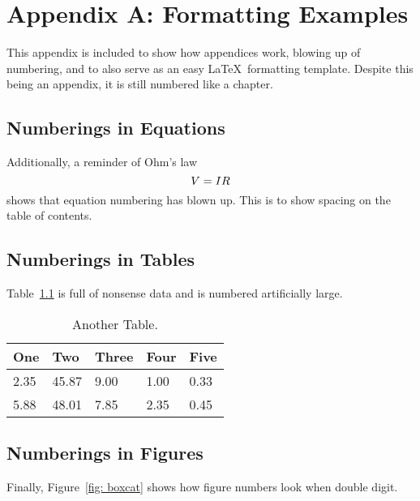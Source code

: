 \chapter{Appendix A: Formatting Examples}


\setcounter{figure}{66}
\setcounter{table}{13}
\setcounter{equation}{41}
This appendix is included to show how appendices work, blowing up of numbering, and to also serve as an easy \LaTeX\ formatting template. Despite this being an appendix, it is still numbered like a chapter.

\section{Numberings in Equations}
Additionally, a reminder of Ohm's law
\begin{equation}{\label{eq:ohms law} }
V = IR
\end{equation} %
\noindent shows that equation numbering has blown up. This is to show spacing on the table of contents.
 
\section{Numberings in Tables}
Table~\ref{tab:exp2} is full of nonsense data and is numbered artificially large.

\begin{table}[!ht]
	\centering
	\begin{tabular}{@{} lllll @{}} 	
		\toprule %
		\footnotesize %
		One& Two  & Three  & Four  & Five  \\
		\midrule		
		2.35& 45.87  & 9.00  & 1.00  &0.33  \\
		5.88& 48.01  & 7.85  & 2.35  & 0.45 \\
		\bottomrule
	\end{tabular}
	\caption{Another Table.}
	\label{tab:exp2}
\end{table}

\section{Numberings in Figures}
Finally, Figure~\ref{fig: boxcat} shows how figure numbers look when double digit.

